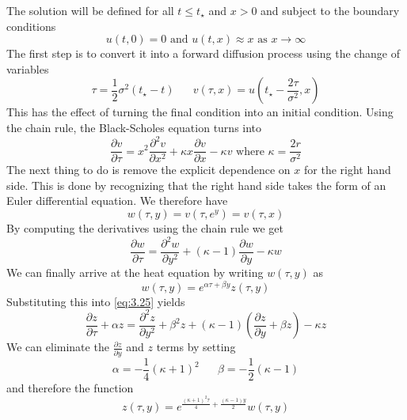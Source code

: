 \documentclass{article}
\newcommand{\pd}[2]{\frac{\partial #1}{\partial #2}}
\newcommand{\pdt}[2]{\frac{\partial ^2 #1}{\partial #2 ^2}}
\numberwithin{equation}{section}
\begin{document}
The solution will be defined for all $t\leq t_\star$ and $x>0$ and subject to the boundary conditions
\begin{equation*}
    u(t,0) = 0 \text{ and } u(t,x) \approx x \text{ as } x\rightarrow \infty
\end{equation*}
The first step is to convert it into a forward diffusion process using the change of variables 
\begin{equation}
    \tau = \frac{1}{2} \sigma^2(t_\star -t) \hspace{20pt} v(\tau,x) = u\left(t_\star - \frac{2\tau}{\sigma^2},x \right)
\end{equation}
This has the effect of turning the final condition into an initial condition. Using the chain rule, the Black-Scholes equation turns into 
\begin{equation}
    \pd{v}{\tau} =x^2\pdt{v}{x} +\kappa x\pd{v}{x}-\kappa v \text{ where } \kappa =\frac{2r}{\sigma^2}
\end{equation}
The next thing to do is remove the explicit dependence on $x$ for the right hand side. This is done by recognizing that the right hand side takes the form of an Euler differential equation. We therefore have
\begin{equation}
    w(\tau,y) = v(\tau,e^y)=v(\tau,x)
\end{equation}
By computing the derivatives using the chain rule we get 
\begin{equation}
    \pd{w}{\tau} = \pdt{w}{y}+(\kappa -1)\pd{w}{y} -\kappa w \label{eq:3.25}
\end{equation}
We can finally arrive at the heat equation by writing $w(\tau,y)$ as 
\begin{equation}
    w(\tau,y) = e^{\alpha \tau+\beta y}z(\tau,y)    
\end{equation}
Substituting this into \eqref{eq:3.25} yields
\begin{equation}
    \pd{z}{\tau} +\alpha z= \pdt{z}{y} +\beta^2 z+(\kappa-1)\left( \pd{z}{y}  +\beta z\right) - \kappa z
\end{equation}
We can eliminate the $\pd{z}{y}$ and $z$ terms by setting 
\begin{equation*}
    \alpha = -\frac{1}{4}(\kappa +1)^2 \hspace{20pt}\beta = -\frac{1}{2}(\kappa-1)
\end{equation*}
and therefore the function 
\begin{equation}
    z(\tau,y) =e^{\frac{(\kappa+1)^2\tau}{4}+\frac{(\kappa-1)y}{2}}w(\tau,y)
\end{equation}
\end{document}
